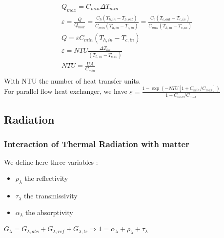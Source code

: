 \documentclass[../main.tex]{subfiles}
\begin{document}
\begin{equation}
    \begin{gathered}
        Q_{max} = C_{min} \Delta T_{min}\\
        \varepsilon = \frac{Q}{Q_{max}} = \frac{C_h(T_{h,in} - T_{h,out})}{C_{min} (T_{h,in} - T_{c,in})} = \frac{C_c(T_{c,out} - T_{c,in})}{C_{min} (T_{h,in} - T_{c,in})}\\
        Q = \varepsilon C_{min} (T_{h,in} - T_{c,in})\\
        \varepsilon = NTU \frac{\Delta T_{lm}}{(T_{h,in} - T_{c,in})}\\
        NTU = \frac{UA}{C_{min}}\\
    \end{gathered}
\end{equation}
With NTU the number of heat transfer units. \\

For parallel flow heat exchanger, we have $\varepsilon = \frac{1-\exp(-NTU[1+ C_{min}/C_{max}])}{1+ C_{min}/C_{max}}$\\

\subsection{Radiation}

\subsubsection{Interaction of Thermal Radiation with matter}
We define here three variables : \begin{itemize}
    \item $\rho_\lambda$ the reflectivity\\
    \item $\tau_\lambda$ the transmissivity\\
    \item $\alpha_\lambda$ the absorptivity\\
\end{itemize}
$G_\lambda = G_{\lambda, abs} + G_{\lambda, ref} + G_{\lambda, tr}\Rightarrow 1 = \alpha_\lambda + \rho_\lambda + \tau_\lambda$\\
\end{document}
